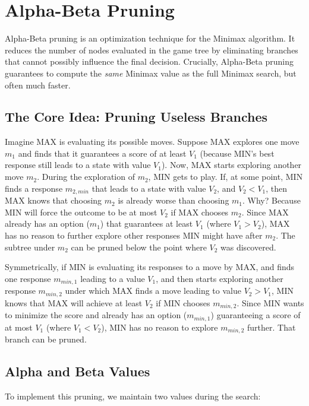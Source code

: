 \documentclass[11pt]{article}
\begin{document}
\section{Alpha-Beta Pruning}

Alpha-Beta pruning is an optimization technique for the Minimax algorithm. It reduces the number of nodes evaluated in the game tree by eliminating branches that cannot possibly influence the final decision. Crucially, Alpha-Beta pruning guarantees to compute the \textit{same} Minimax value as the full Minimax search, but often much faster.

\subsection{The Core Idea: Pruning Useless Branches}

Imagine MAX is evaluating its possible moves. Suppose MAX explores one move $m_1$ and finds that it guarantees a score of at least $V_1$ (because MIN's best response still leads to a state with value $V_1$). Now, MAX starts exploring another move $m_2$. During the exploration of $m_2$, MIN gets to play. If, at some point, MIN finds a response $m_{2,min}$ that leads to a state with value $V_2$, and $V_2 < V_1$, then MAX knows that choosing $m_2$ is already worse than choosing $m_1$. Why? Because MIN will force the outcome to be at most $V_2$ if MAX chooses $m_2$. Since MAX already has an option ($m_1$) that guarantees at least $V_1$ (where $V_1 > V_2$), MAX has no reason to further explore other responses MIN might have after $m_2$. The subtree under $m_2$ can be pruned below the point where $V_2$ was discovered.

Symmetrically, if MIN is evaluating its responses to a move by MAX, and finds one response $m_{min,1}$ leading to a value $V_1$, and then starts exploring another response $m_{min,2}$ under which MAX finds a move leading to value $V_2 > V_1$, MIN knows that MAX will achieve at least $V_2$ if MIN chooses $m_{min,2}$. Since MIN wants to minimize the score and already has an option ($m_{min,1}$) guaranteeing a score of at most $V_1$ (where $V_1 < V_2$), MIN has no reason to explore $m_{min,2}$ further. That branch can be pruned.

\subsection{Alpha and Beta Values}

To implement this pruning, we maintain two values during the search:
\end{document}
